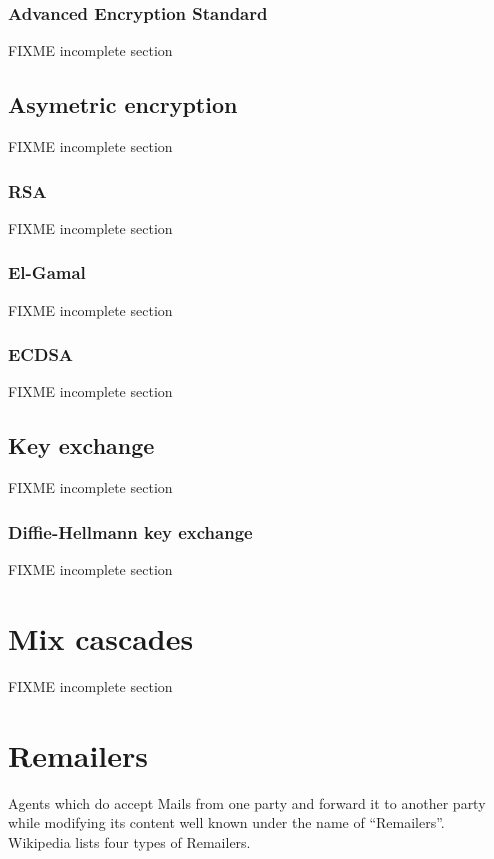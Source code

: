 \subsubsection{Advanced Encryption Standard}
FIXME incomplete section

\subsection{Asymetric encryption}
FIXME incomplete section

\subsubsection{RSA}
FIXME incomplete section

\subsubsection{El-Gamal}
FIXME incomplete section

\subsubsection{ECDSA}
FIXME incomplete section

\subsection{Key exchange}
FIXME incomplete section

\subsubsection{Diffie-Hellmann key exchange}
FIXME incomplete section

\section{Mix cascades}
FIXME incomplete section

\section{Remailers}
Agents which do accept Mails from one party and forward it to another party while modifying its content well known under the name of ``Remailers''. Wi\-ki\-pe\-dia \cite{wiki:remailer} lists four types of Remailers.\par

